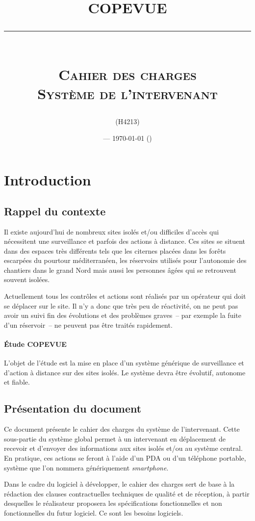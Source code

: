\documentclass[a4paper, 11pt, final]{article}
\title{\textbf{COPEVUE}\\
\rule{\textwidth}{1pt}{}\\
\Huge{\textsc{Cahier des charges\\Système de l'intervenant}}}
\author{\docauthor{} (H4213)}
\date{\docname{} --- \today{} (\docstatus{})}
\begin{document}
\maketitle

\tableofcontents

\pagebreak

\section{Introduction}

\subsection{Rappel du contexte}
Il existe aujourd'hui de nombreux sites isolés et/ou difficiles d'accès qui nécessitent une surveillance et parfois des actions à distance. Ces sites se situent dans des espaces très différents tels que les citernes placées dans les forêts escarpées du pourtour méditerranéen, les réservoirs utilisés pour l'autonomie des chantiers dans le grand Nord mais aussi les personnes âgées qui se retrouvent souvent isolées.

Actuellement tous les contrôles et actions sont réalisés par un opérateur qui doit se déplacer sur le site. Il n'y a donc que très peu de réactivité, on ne peut pas avoir un suivi fin des évolutions et des problèmes graves~-- par exemple la fuite d'un réservoir~-- ne peuvent pas être traités rapidement.

\paragraph{Étude COPEVUE}
L'objet de l'étude est la mise en place d'un système générique de surveillance et d'action à distance sur des sites isolés. Le système devra être évolutif, autonome et fiable.

\subsection{Présentation du document}
Ce document présente le cahier des charges du système de l'intervenant. Cette sous-partie du système global permet à un intervenant en déplacement de recevoir et d'envoyer des informations aux sites isolés et/ou au système central. En pratique, ces actions se feront à l'aide d'un PDA ou d'un téléphone portable, système que l'on nommera génériquement \textit{smartphone}.

Dans le cadre du logiciel à développer, le cahier des charges sert de base à la rédaction des clauses contractuelles techniques de qualité et de réception, à partir desquelles le réalisateur proposera les spécifications fonctionnelles et non fonctionnelles du futur logiciel. Ce sont les besoins logiciels.
\end{document}
